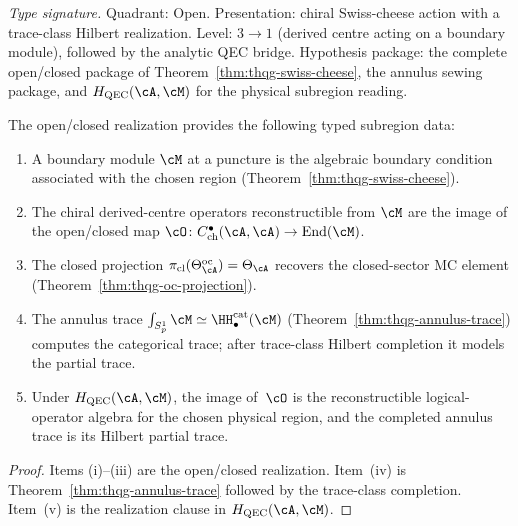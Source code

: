\begin{theorem}
\label{thm:thqg-entanglement-wedge}
\textit{Type signature.}
Quadrant: Open.  Presentation: chiral Swiss-cheese action with a
trace-class Hilbert realization.  Level: $3\to1$ (derived centre
acting on a boundary module), followed by the analytic QEC bridge.
Hypothesis package: the complete open/closed package of
Theorem~\ref{thm:thqg-swiss-cheese}, the annulus sewing package, and
$H_{\mathrm{QEC}}(\cA,\cM)$ for the physical subregion reading.

\medskip
The open/closed realization provides the following typed subregion
data:
\begin{enumerate}[label=\textup{(\roman*)}]
\item A boundary module $\cM$ at a puncture is the algebraic boundary
 condition associated with the chosen region
 (Theorem~\ref{thm:thqg-swiss-cheese}).

\item The chiral derived-centre operators reconstructible from $\cM$
 are the image of the open/closed map
 $\cO \colon C^\bullet_{\mathrm{ch}}(\cA, \cA) \to
 \operatorname{End}(\cM)$.

\item The closed projection
 $\pi_{\mathrm{cl}}(\Theta^{\mathrm{oc}}_\cA) = \Theta_\cA$
 recovers the closed-sector MC element
 (Theorem~\ref{thm:thqg-oc-projection}).

\item The annulus trace
 $\int_{S^1_p} \cM \simeq \HH^{\mathrm{cat}}_\bullet(\cM)$
 (Theorem~\ref{thm:thqg-annulus-trace})
 computes the categorical trace; after trace-class Hilbert completion
 it models the partial trace.

\item Under $H_{\mathrm{QEC}}(\cA,\cM)$, the image of~$\cO$ is the
 reconstructible logical-operator algebra for the chosen physical
 region, and the completed annulus trace is its Hilbert partial trace.
\end{enumerate}
\end{theorem}

\begin{proof}
Items \textup{(i)--(iii)} are the open/closed realization.
Item~\textup{(iv)} is Theorem~\ref{thm:thqg-annulus-trace} followed by
the trace-class completion.  Item~\textup{(v)} is the realization
clause in $H_{\mathrm{QEC}}(\cA,\cM)$.
\end{proof}

